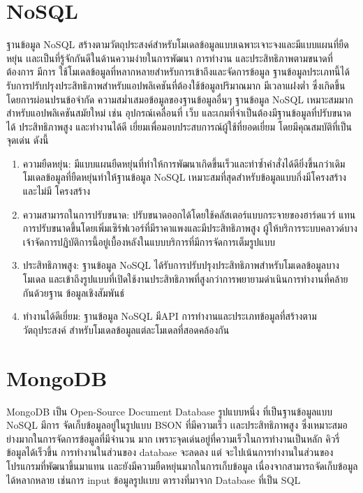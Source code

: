 \section{NoSQL}
ฐานข้อมูล NoSQL\cite{no} สร้างตามวัตถุประสงค์สําหรับโมเดลข้อมูลแบบเฉพาะเจาะจงและมีแบบแผนที่ยืดหยุ่น
เเละเป็นที่รู้จักกันดีในด้านความง่ายในการพัฒนา การทํางาน และประสิทธิภาพตามขนาดที่ต้องการ มีการ
ใช้โมเดลข้อมูลที่หลากหลายสําหรับการเข้าถึงและจัดการข้อมูล ฐานข้อมูลประเภทนี้ได้รับการปรับปรุงประสิทธิภาพสําหรับแอปพลิเคชันที่ต้องใช้ข้อมูลปริมาณมาก มีเวลาแฝงตํ่า ซึ่งเกิดขึ้นโดยการผ่อนปรนข้อจํากัด
ความสมํ่าเสมอข้อมูลของฐานข้อมูลอื่นๆ ฐานข้อมูล NoSQL เหมาะสมมากสําหรับแอปพลิเคชันสมัยใหม่
เช่น อุปกรณ์เคลื่อนที่ เว็บ และเกมที่จําเป็นต้องมีฐานข้อมูลที่ปรับขนาดได้ ประสิทธิภาพสูง และทํางานได้ดี
เยี่ยมเพื่อมอบประสบการณ์ผู้ใช้ที่ยอดเยี่ยม โดยมีคุณสมบัติที่เป็นจุดเด่น ดังนี้
\begin{enumerate}
  \item ความยืดหยุ่น: มีแบบแผนยืดหยุ่นที่ทําให้การพัฒนาเกิดขึ้นเร็วและทําซํ้าคําสั่งได้ดียิ่งขึ้นกว่าเดิม โมเดลข้อมูลที่ยืดหยุ่นทําให้ฐานข้อมูล NoSQL เหมาะสมที่สุดสําหรับข้อมูลแบบกึ่งมีโครงสร้างและไม่มี
  โครงสร้าง
  \item ความสามารถในการปรับขนาด: ปรับขนาดออกได้โดยใช้คลัสเตอร์แบบกระจายของฮาร์ดแวร์ แทน
  การปรับขนาดขึ้นโดยเพิ่มเซิร์ฟเวอร์ที่มีราคาแพงและมีประสิทธิภาพสูง ผู้ให้บริการระบบคลาวด์บาง
  เจ้าจัดการปฏิบัติการนี้อยู่เบื้องหลังในแบบบริการที่มีการจัดการเต็มรูปแบบ
  \item ประสิทธิภาพสูง: ฐานข้อมูล NoSQL ได้รับการปรับปรุงประสิทธิภาพสําหรับโมเดลข้อมูลบางโมเดล
  และเข้าถึงรูปแบบที่เปิดใช้งานประสิทธิภาพที่สูงกว่าการพยายามดําเนินการทํางานที่คล้ายกันด้วยฐาน
  ข้อมูลเชิงสัมพันธ์
  \item ทํางานได้ดีเยี่ยม: ฐานข้อมูล NoSQL มีAPI การทํางานและประเภทข้อมูลที่สร้างตามวัตถุประสงค์
  สําหรับโมเดลข้อมูลแต่ละโมเดลที่สอดคล้องกัน
\end{enumerate}

\section{MongoDB}
MongoDB\cite{mongo} เป็น Open-Source Document Database รูปแบบหนึ่ง ที่เป็นฐานข้อมูลแบบ NoSQL มีการ
จัดเก็บข้อมูลอยู่ในรูปแบบ BSON ที่มีความเร็ว เเละประสิทธิภาพสูง ซึ่งเหมาะสมอย่างมากในการจัดการข้อมูลที่มีจํานวน
มาก เพราะจุดเด่นอยู่ที่ความเร็วในการทํางานเป็นหลัก คิวรี่ข้อมูลได้เร็วขึ้น การทํางานในส่วนของ database จะลดลง แต่
จะไปเน้นการทํางานในส่วนของโปรแกรมที่พัฒนาขึ้นมาแทน เเละยังมีความยืดหยุ่นมากในการเก็บข้อมูล เนื่องจากสามารถจัดเก็บข้อมูลได้หลากหลาย 
เช่นการ input ข้อมูลรูปเเบบ ตารางที่มาจาก Database ที่เป็น SQL

